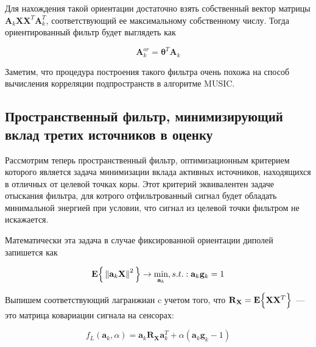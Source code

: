 Для нахождения такой ориентации достаточно взять собственный вектор матрицы
$\mathbf{A}_k \mathbf{X}\mathbf{X}^T \mathbf{A}_k^T$,
соответствующий ее максимальному собственному числу.
Тогда ориентированный фильтр будет выглядеть как

\begin{equation}
    \mathbf{A}_{k}^{or} = \boldsymbol{\theta}^T \mathbf{A}_k
\end{equation}

Заметим, что процедура построения такого фильтра очень похожа на способ
вычисления корреляции подпространств в алгоритме MUSIC\@.

\subsection{Пространственный фильтр, минимизирующий вклад третих источников в оценку}
\label{sec:min_interference_filter}

Рассмотрим теперь пространственный фильтр,
оптимизационным критерием которого является задача минимизации
вклада активных источников, находящихся в отличных от целевой точках коры.
Этот критерий эквивалентен задаче отыскания фильтра, для котрого отфильтрованный
сигнал будет обладать минимальной энергией при условии, что
сигнал из целевой точки фильтром не искажается.

Математически эта задача в случае фиксированной ориентации диполей запишется как

\begin{equation}
    \mathbf{E}\Big\{\left\lVert\mathbf{a}_k \mathbf{X}\right\rVert^2\Big\}
    \rightarrow \underset{\mathbf{a}_k}{\min},
    s.t.: \mathbf{a}_k \mathbf{g}_k = 1
    \label{lcmv_objective_nonreg}
\end{equation}

Выпишем соответствующий лагранжиан c учетом того,
что $\mathbf{R}_{\mathbf{X}} = \mathbf{E}\Big\{\mathbf{X}\mathbf{X}^T\Big\}$~---
это матрица ковариации сигнала на сенсорах:

\begin{equation}
    f_L(\mathbf{a}_k, \alpha) = \mathbf{a}_k \mathbf{R}_{\mathbf{X}} \mathbf{a}_k^T +
                                 \alpha (\mathbf{a}_k \mathbf{g}_k - 1)
\end{equation}



